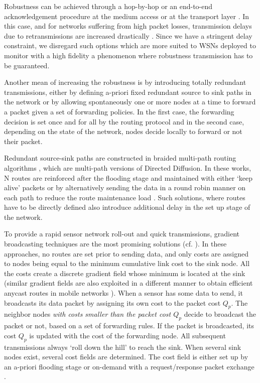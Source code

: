 \documentclass[journal, peerreview, onecolumn, draftcls]{IEEEtran}
\begin{document}
Robustness can be achieved through a hop-by-hop or an end-to-end acknowledgement procedure at the medium access or at the transport layer \cite{Stann03}. In this case, and for networks suffering from high packet losses, transmission delays due to retransmissions are increased drastically \cite{RRZhang}. Since we have a stringent delay constraint, we disregard such options which are more suited to WSNs deployed to monitor with a high fidelity a phenomenon where robustness transmission has to be guaranteed.

Another mean of increasing the robustness is by introducing totally redundant transmissions, either by defining a-priori fixed redundant source to sink paths in the network or by allowing spontaneously one or more nodes at a time to forward a packet given a set of forwarding policies. In the first case, the forwarding decision is set once and for all by the routing protocol and in the second case, depending on the state of the network, nodes decide locally to forward or not their packet.

Redundant source-sink paths are constructed in braided multi-path routing algorithms \cite{ganesan01, bush05}, which are multi-path versions of Directed Diffusion. In these works, N routes are reinforced after the flooding stage and maintained with either `keep alive' packets \cite{ganesan01} or by alternatively sending the data in a round robin manner on each path to reduce the route maintenance load \cite{bush05}. Such solutions, where routes have to be directly defined also introduce additional delay in the set up stage of the network.

To provide a rapid sensor network roll-out and quick transmissions, gradient broadcasting techniques are the most promising solutions (cf. \cite{Maroti04,GRAB05,Chen05,Lim05, Poor}).
In these approaches, no routes are set prior to sending data, and only costs are assigned to nodes being equal to the minimum cumulative link cost to the sink node.
All the costs create a discrete gradient field whose minimum is located at the sink (similar gradient fields are also exploited in a different manner to obtain efficient anycast routes in mobile networks \cite{lenders2006}). When a sensor has some data to send, it broadcasts its data packet by assigning its own cost to the packet cost $Q_p$. The neighbor nodes {\it with costs smaller than the packet cost $Q_p$} decide to broadcast the packet or not, based on a set of forwarding rules. If the packet is broadcasted, its cost $Q_p$ is updated with the cost of the forwarding node. All subsequent transmissions always `roll down the hill' to reach the sink. When several sink nodes exist, several cost fields are determined. The cost field is either set up by an a-priori flooding stage \cite{Maroti04,GRAB01,GRAB05,Lim05} or on-demand with a request/response packet exchange \cite{Poor,Chen05}.
\end{document}
